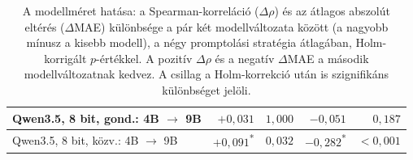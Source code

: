 \documentclass[
]{elteikthesis}[2024/04/26]
\begin{document}
\begin{table}[htbp]
\begin{tabular}{ | l | r | r | r | r | }
		\hline
		Qwen3.5, 8 bit, gond.: 4B $\rightarrow$ 9B & $+0{,}031$ & $1{,}000$ & $-0{,}051$ & $0{,}187$ \\
		\hline
		Qwen3.5, 8 bit, közv.: 4B $\rightarrow$ 9B & $+0{,}091$\textsuperscript{*} & $0{,}032$ & $-0{,}282$\textsuperscript{*} & $<0{,}001$ \\
		\hline
	\end{tabular}
	\caption[A modellméret hatása]{A modellméret hatása: a Spearman-korreláció ($\Delta\rho$) és az átlagos abszolút eltérés
	($\Delta$MAE) különbsége a pár két modellváltozata között (a nagyobb mínusz a kisebb modell), a négy promptolási
	stratégia átlagában, Holm-korrigált $p$-értékkel. A pozitív $\Delta\rho$ és a negatív $\Delta$MAE a
	második modellváltozatnak kedvez. A csillag a Holm-korrekció után is szignifikáns különbséget jelöli.}
	\label{tab:app:axis:size}
\end{table}
\end{document}
